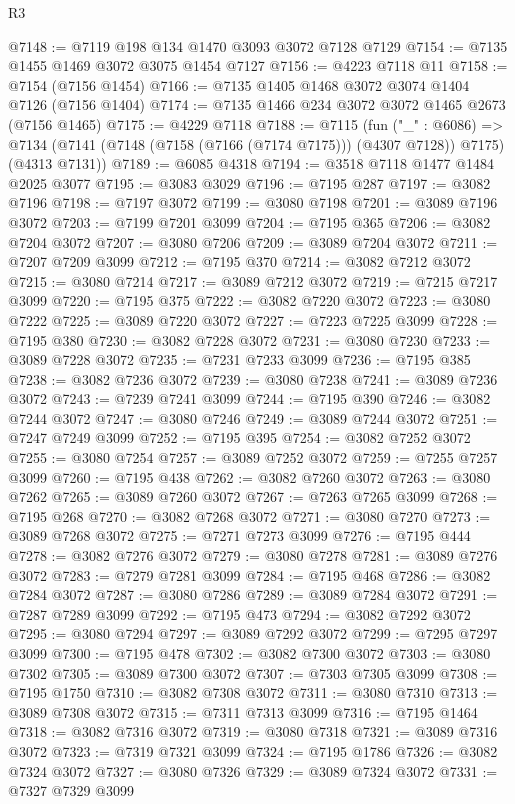 \begin{lexlean}{R3}
\begin{coremodule}
@7148 := @7119 @198 @134 @1470 @3093 @3072 @7128 @7129
@7154 := @7135 @1455 @1469 @3072 @3075 @1454 @7127
@7156 := @4223 @7118 @11
@7158 := @7154 (@7156 @1454)
@7166 := @7135 @1405 @1468 @3072 @3074 @1404 @7126 (@7156 @1404)
@7174 := @7135 @1466 @234 @3072 @3072 @1465 @2673 (@7156 @1465)
@7175 := @4229 @7118
@7188 := @7115
    (fun ("_" : @6086) =>
    @7134 (@7141 (@7148 (@7158 (@7166 (@7174 @7175))) (@4307 @7128)) @7175) (@4313 @7131))
@7189 := @6085 @4318
@7194 := @3518 @7118 @1477 @1484 @2025 @3077
@7195 := @3083 @3029
@7196 := @7195 @287
@7197 := @3082 @7196
@7198 := @7197 @3072
@7199 := @3080 @7198
@7201 := @3089 @7196 @3072
@7203 := @7199 @7201 @3099
@7204 := @7195 @365
@7206 := @3082 @7204 @3072
@7207 := @3080 @7206
@7209 := @3089 @7204 @3072
@7211 := @7207 @7209 @3099
@7212 := @7195 @370
@7214 := @3082 @7212 @3072
@7215 := @3080 @7214
@7217 := @3089 @7212 @3072
@7219 := @7215 @7217 @3099
@7220 := @7195 @375
@7222 := @3082 @7220 @3072
@7223 := @3080 @7222
@7225 := @3089 @7220 @3072
@7227 := @7223 @7225 @3099
@7228 := @7195 @380
@7230 := @3082 @7228 @3072
@7231 := @3080 @7230
@7233 := @3089 @7228 @3072
@7235 := @7231 @7233 @3099
@7236 := @7195 @385
@7238 := @3082 @7236 @3072
@7239 := @3080 @7238
@7241 := @3089 @7236 @3072
@7243 := @7239 @7241 @3099
@7244 := @7195 @390
@7246 := @3082 @7244 @3072
@7247 := @3080 @7246
@7249 := @3089 @7244 @3072
@7251 := @7247 @7249 @3099
@7252 := @7195 @395
@7254 := @3082 @7252 @3072
@7255 := @3080 @7254
@7257 := @3089 @7252 @3072
@7259 := @7255 @7257 @3099
@7260 := @7195 @438
@7262 := @3082 @7260 @3072
@7263 := @3080 @7262
@7265 := @3089 @7260 @3072
@7267 := @7263 @7265 @3099
@7268 := @7195 @268
@7270 := @3082 @7268 @3072
@7271 := @3080 @7270
@7273 := @3089 @7268 @3072
@7275 := @7271 @7273 @3099
@7276 := @7195 @444
@7278 := @3082 @7276 @3072
@7279 := @3080 @7278
@7281 := @3089 @7276 @3072
@7283 := @7279 @7281 @3099
@7284 := @7195 @468
@7286 := @3082 @7284 @3072
@7287 := @3080 @7286
@7289 := @3089 @7284 @3072
@7291 := @7287 @7289 @3099
@7292 := @7195 @473
@7294 := @3082 @7292 @3072
@7295 := @3080 @7294
@7297 := @3089 @7292 @3072
@7299 := @7295 @7297 @3099
@7300 := @7195 @478
@7302 := @3082 @7300 @3072
@7303 := @3080 @7302
@7305 := @3089 @7300 @3072
@7307 := @7303 @7305 @3099
@7308 := @7195 @1750
@7310 := @3082 @7308 @3072
@7311 := @3080 @7310
@7313 := @3089 @7308 @3072
@7315 := @7311 @7313 @3099
@7316 := @7195 @1464
@7318 := @3082 @7316 @3072
@7319 := @3080 @7318
@7321 := @3089 @7316 @3072
@7323 := @7319 @7321 @3099
@7324 := @7195 @1786
@7326 := @3082 @7324 @3072
@7327 := @3080 @7326
@7329 := @3089 @7324 @3072
@7331 := @7327 @7329 @3099

\end{coremodule}
\end{lexlean}
